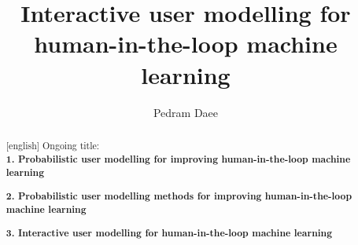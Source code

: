 \documentclass[dissertation,math,vertlayout,pdfa,colorlinks]{aaltoseries}
\author{Pedram Daee}
\title{Interactive user modelling for human-in-the-loop machine learning} %
\begin{document}





\begin{abstract}[english]
	Ongoing title: \\
	\textbf{1. Probabilistic user modelling for improving human-in-the-loop machine learning}
	
	\noindent\textbf{2. Probabilistic user modelling methods for improving human-in-the-loop machine learning}
	
	\noindent\textbf{3. Interactive user modelling for human-in-the-loop machine learning} %
	
	
	
	
	
\end{abstract}


\end{document}
